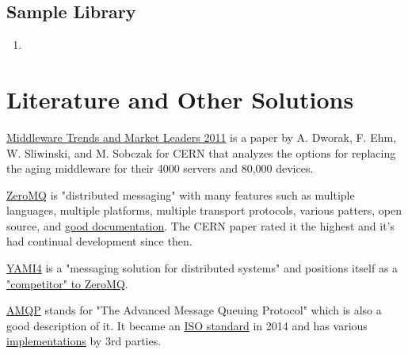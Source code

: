 \documentclass[twoside]{article}
\begin{document}
\subsection{Sample Library}
\begin{enumerate}
    \item 
\end{enumerate}



\section{Literature and Other Solutions}

\href{http://zeromq.wdfiles.com/local--files/intro\%3Aread-the-manual/Middleware\%20Trends\%20and\%20Market\%20Leaders\%202011.pdf}{Middleware Trends and Market Leaders 2011} is a paper by A. Dworak, F. Ehm, W. Sliwinski, and M. Sobczak for CERN that analyzes the options for replacing the aging middleware for their 4000 servers and 80,000 devices. 

\href{http://zeromq.org}{ZeroMQ} is "distributed messaging" with many features such as multiple languages, multiple platforms, multiple transport protocols, various patters, open source, and \href{http://zeromq.org/intro:read-the-manual}{good documentation}. The CERN paper rated it the highest and it's had continual development since then.

\href{http://www.inspirel.com/yami4/}{YAMI4} is a "messaging solution for distributed systems" and positions itself as a \href{http://www.inspirel.com/articles/YAMI4_vs_ZeroMQ.html}{"competitor" to ZeroMQ}.

\href{http://www.amqp.org/}{AMQP} stands for "The Advanced Message Queuing Protocol" which is also a good description of it. It became an \href{https://www.oasis-open.org/news/pr/iso-and-iec-approve-oasis-amqp-advanced-message-queuing-protocol}{ISO standard} in 2014 and has various \href{http://www.amqp.org/about/examples}{implementations} by 3rd parties. 
\end{document}
